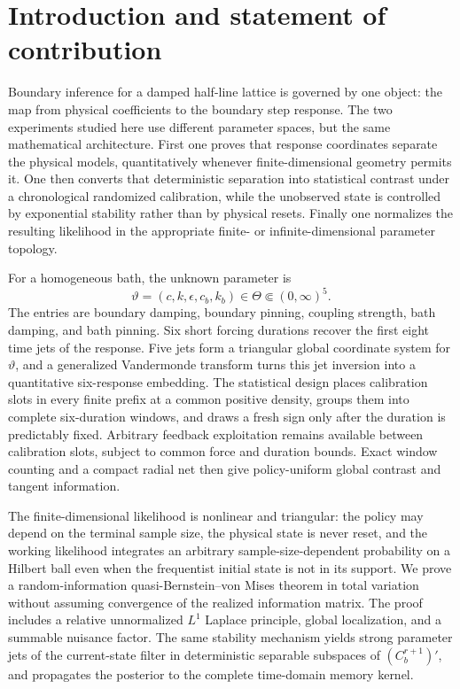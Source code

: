 
\section{Introduction and statement of contribution}
\label{sec:introduction}

Boundary inference for a damped half-line lattice is governed by one object:
the map from physical coefficients to the boundary step response.  The two
experiments studied here use different parameter spaces, but the same
mathematical architecture.  First one proves that response coordinates
separate the physical models, quantitatively whenever finite-dimensional
geometry permits it.  One then converts that deterministic separation into
statistical contrast under a chronological randomized calibration, while the
unobserved state is controlled by exponential stability rather than by
physical resets.  Finally one normalizes the resulting likelihood in the
appropriate finite- or infinite-dimensional parameter topology.

For a homogeneous bath, the unknown parameter is
\[
 \vartheta=(c,k,\epsilon,c_b,k_b)\in\Theta\Subset(0,\infty)^5.
\]
The entries are boundary damping, boundary pinning, coupling strength, bath
damping, and bath pinning.  Six short forcing durations recover the first
eight time jets of the response.  Five jets form a triangular global
coordinate system for \(\vartheta\), and a generalized Vandermonde transform
turns this jet inversion into a quantitative six-response embedding.  The
statistical design places calibration slots in every finite prefix at a
common positive density, groups them into complete six-duration windows, and
draws a fresh sign only after the duration is predictably fixed.  Arbitrary
feedback exploitation remains available between calibration slots, subject
to common force and duration bounds.  Exact window counting and a compact
radial net then give policy-uniform global contrast and tangent information.

The finite-dimensional likelihood is nonlinear and triangular: the policy
may depend on the terminal sample size, the physical state is never reset,
and the working likelihood integrates an arbitrary sample-size-dependent
probability on a Hilbert ball even when the frequentist initial state is not
in its support.  We prove a random-information quasi-Bernstein--von Mises
theorem in total variation without assuming convergence of the realized
information matrix.  The proof includes a relative unnormalized \(L^1\)
Laplace principle, global localization, and a summable nuisance factor.  The
same stability mechanism yields strong parameter jets of the current-state
filter in deterministic separable subspaces of
\((C_b^{r+1})'\), and propagates the posterior to the complete time-domain
memory kernel.

